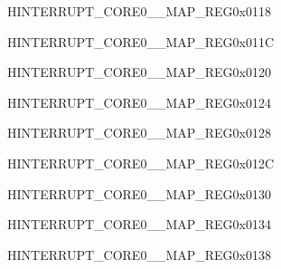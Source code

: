 \begin{register}{H}{INTERRUPT\_CORE0\_\_MAP\_REG}{0x0118}\label{regdesc:INTERRUPTCORE0DMACH4INTMAPREG}
\end{register}
\vspace{-3em}

\begin{register}{H}{INTERRUPT\_CORE0\_\_MAP\_REG}{0x011C}\label{regdesc:INTERRUPTCORE0RSAINTMAPREG}
\end{register}
\vspace{-3em}

\begin{register}{H}{INTERRUPT\_CORE0\_\_MAP\_REG}{0x0120}\label{regdesc:INTERRUPTCORE0AESINTMAPREG}
\end{register}
\vspace{-3em}

\begin{register}{H}{INTERRUPT\_CORE0\_\_MAP\_REG}{0x0124}\label{regdesc:INTERRUPTCORE0SHAINTMAPREG}
\end{register}
\vspace{-3em}

\begin{register}{H}{INTERRUPT\_CORE0\_\_MAP\_REG}{0x0128}\label{regdesc:INTERRUPTCORE0CPUINTRFROMCPU0MAPREG}
\end{register}
\vspace{-3em}

\begin{register}{H}{INTERRUPT\_CORE0\_\_MAP\_REG}{0x012C}\label{regdesc:INTERRUPTCORE0CPUINTRFROMCPU1MAPREG}
\end{register}
\vspace{-3em}

\begin{register}{H}{INTERRUPT\_CORE0\_\_MAP\_REG}{0x0130}\label{regdesc:INTERRUPTCORE0CPUINTRFROMCPU2MAPREG}
\end{register}
\vspace{-3em}

\begin{register}{H}{INTERRUPT\_CORE0\_\_MAP\_REG}{0x0134}\label{regdesc:INTERRUPTCORE0CPUINTRFROMCPU3MAPREG}
\end{register}
\vspace{-3em}

\begin{register}{H}{INTERRUPT\_CORE0\_\_MAP\_REG}{0x0138}\label{regdesc:INTERRUPTCORE0ASSISTDEBUGINTRMAPREG}
\end{register}
\vspace{-3em}

